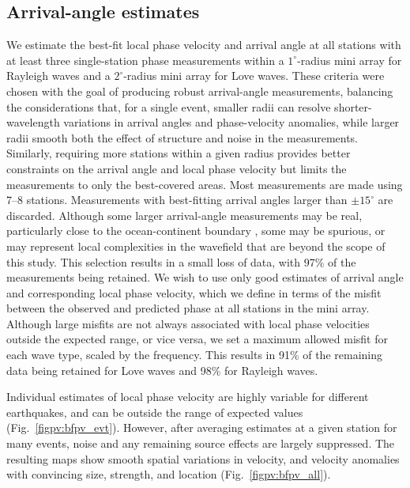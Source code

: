 \documentclass[12pt,oneside]{book}
\newcommand{\degree}[1]{\mbox{$#1^{\circ}$}}
\begin{document}
\subsection{Arrival-angle estimates}\label{sec:analysisminiarray}
We estimate the best-fit local phase velocity and arrival angle at all stations with at least three single-station phase measurements within a \degree{1}\nobreakdash-radius mini array for Rayleigh waves and a \degree{2}\nobreakdash-radius mini array for Love waves. These criteria were chosen with the goal of producing robust arrival-angle measurements, balancing the considerations that, for a single event, smaller radii can resolve shorter-wavelength variations in arrival angles and phase-velocity anomalies, while larger radii smooth both the effect of structure and noise in the measurements. Similarly, requiring more stations within a given radius provides better constraints on the arrival angle and local phase velocity but limits the measurements to only the best-covered areas. Most measurements are made using 7--8 stations. Measurements with best-fitting arrival angles larger than $\pm\degree{15}$ are discarded. Although some larger arrival-angle measurements may be real, particularly close to the ocean-continent boundary \citep{Tanimoto2007}, some may be spurious, or may represent local complexities in the wavefield that are beyond the scope of this study. This selection results in a small loss of data, with 97\% of the measurements being retained. We wish to use only good estimates of arrival angle and corresponding local phase velocity, which we define in terms of the misfit between the observed and predicted phase at all stations in the mini array. Although large misfits are not always associated with local phase velocities outside the expected range, or vice versa, we set a maximum allowed misfit for each wave type, scaled by the frequency. This results in 91\% of the remaining data being retained for Love waves and 98\% for Rayleigh waves. 

Individual estimates of local phase velocity are highly variable for different earthquakes, and can be outside the range of expected values (Fig.~\ref{figpv:bfpv_evt}). However, after averaging estimates at a given station for many events, noise and any remaining source effects are largely suppressed. The resulting maps show smooth spatial variations in velocity, and velocity anomalies with convincing size, strength, and location (Fig.~\ref{figpv:bfpv_all}). 
\end{document}
